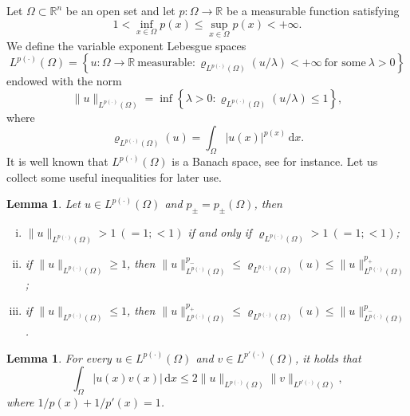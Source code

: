 \documentclass[11pt]{amsart}
\theoremstyle{plain}
\newtheorem{lemma}[theorem]{Lemma}
\theoremstyle{definition}
\numberwithin{equation}{section}
\begin{document}
Let $\Omega \subset \mathbb{R}^n$ be an open set and let $p: \Omega \to \mathbb{R}$ be a measurable function satisfying
\begin{equation*}
1 < \inf_{x\in\Omega} p(x) \leq \sup_{x\in\Omega} p(x) < +\infty.
\end{equation*}
We define the variable exponent Lebesgue spaces
\begin{equation*}
L^{p(\cdot)}(\Omega) = \left\lbrace u: \Omega \to \mathbb{R} ~\text{measurable}: \varrho_{L^{p(\cdot)}(\Omega)}(u/\lambda) < +\infty ~\text{for some}~ \lambda > 0 \right\rbrace
\end{equation*}
endowed with the norm 
\begin{equation*}
\|u\|_{L^{p(\cdot)}(\Omega)} = \inf \left\lbrace \lambda > 0: \varrho_{L^{p(\cdot)}(\Omega)}(u/\lambda) \leq 1 \right\rbrace,
\end{equation*}
where
\begin{equation*}
\varrho_{L^{p(\cdot)}(\Omega)}(u) = \int_{\Omega} |u(x)|^{p(x)}\,\mathrm{d}x.
\end{equation*}
It is well known that $L^{p(\cdot)}(\Omega)$ is a Banach space, see \cite{KR91,FZ01,DHHR11} for instance. Let us collect some useful inequalities for later use.

\begin{lemma} \label{lem:modular_Lp}
\cite[Theorem 1.3]{FZ01} Let $u \in L^{p(\cdot)}(\Omega)$ and $p_\pm = p_\pm(\Omega)$, then
\begin{enumerate}[(i)]
\item
$\|u\|_{L^{p(\cdot)}(\Omega)} > 1~ (=1; <1)$ if and only if $\varrho_{L^{p(\cdot)}(\Omega)} > 1~ (=1; <1)$;
\item
if $\|u\|_{L^{p(\cdot)}(\Omega)}\geq 1$, then $\|u\|_{L^{p(\cdot)}(\Omega)}^{p_-} \leq \varrho_{L^{p(\cdot)}(\Omega)}(u) \leq \|u\|_{L^{p(\cdot)}(\Omega)}^{p_+}$;
\item
if $\|u\|_{L^{p(\cdot)}(\Omega)} \leq 1$, then $\|u\|_{L^{p(\cdot)}(\Omega)}^{p_+} \leq \varrho_{L^{p(\cdot)}(\Omega)}(u) \leq \|u\|_{L^{p(\cdot)}(\Omega)}^{p_-}$.
\end{enumerate}
\end{lemma}

\begin{lemma} \label{lem:Holder}
\cite[Theorem 2.1]{KR91} For every $u \in L^{p(\cdot)}(\Omega)$ and $v \in L^{p'(\cdot)}(\Omega)$, it holds that
\begin{equation*}
\int_{\Omega} |u(x)v(x)| \,\mathrm{d}x \leq 2 \|u\|_{L^{p(\cdot)}(\Omega)} \|v\|_{L^{p'(\cdot)}(\Omega)},
\end{equation*}
where $1/p(x) + 1/p'(x) = 1$.
\end{lemma}
\end{document}
